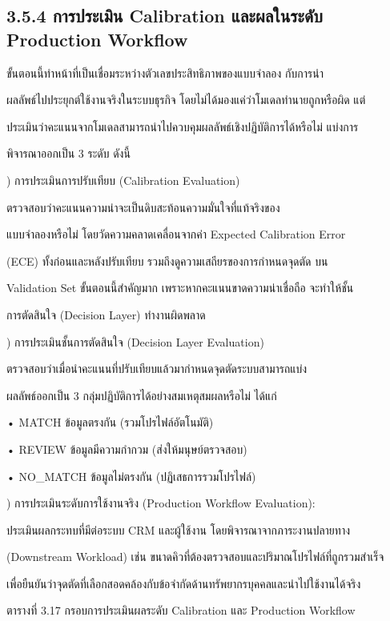 \documentclass[12pt,a4paper]{report}
\begin{document}
\subsection*{3.5.4 การประเมิน Calibration และผลในระดับ Production Workflow}
ขั้นตอนนี้ทำหน้าที่เป็นเชื่อมระหว่างตัวเลขประสิทธิภาพของแบบจำลอง กับการนำ\par
ผลลัพธ์ไปประยุกต์ใช้งานจริงในระบบธุรกิจ โดยไม่ได้มองแค่ว่าโมเดลทำนายถูกหรือผิด แต่\par
ประเมินว่าคะแนนจากโมเดลสามารถนำไปควบคุมผลลัพธ์เชิงปฏิบัติการได้หรือไม่ แบ่งการ\par
พิจารณาออกเป็น 3 ระดับ ดังนี้\par
{}) การประเมินการปรับเทียบ (Calibration Evaluation)\par
ตรวจสอบว่าคะแนนความน่าจะเป็นดิบสะท้อนความมั่นใจที่แท้จริงของ\par
แบบจำลองหรือไม่ โดยวัดความคลาดเคลื่อนจากค่า Expected Calibration Error\par
(ECE) ทั้งก่อนและหลังปรับเทียบ รวมถึงดูความเสถียรของการกำหนดจุดตัด บน\par
\clearpage
Validation Set ขั้นตอนนี้สำคัญมาก เพราะหากคะแนนขาดความน่าเชื่อถือ จะทำให้ชั้น\par
การตัดสินใจ (Decision Layer) ทำงานผิดพลาด\par
{}) การประเมินชั้นการตัดสินใจ (Decision Layer Evaluation)\par
ตรวจสอบว่าเมื่อนำคะแนนที่ปรับเทียบแล้วมากำหนดจุดตัดระบบสามารถแบ่ง\par
ผลลัพธ์ออกเป็น 3 กลุ่มปฏิบัติการได้อย่างสมเหตุสมผลหรือไม่ ได้แก่\par
\noindent • MATCH ข้อมูลตรงกัน (รวมโปรไฟล์อัตโนมัติ)\par
\noindent • REVIEW ข้อมูลมีความกำกวม (ส่งให้มนุษย์ตรวจสอบ)\par
\noindent • NO\_MATCH ข้อมูลไม่ตรงกัน (ปฏิเสธการรวมโปรไฟล์)\par
{}) การประเมินระดับการใช้งานจริง (Production Workflow Evaluation):\par
ประเมินผลกระทบที่มีต่อระบบ CRM และผู้ใช้งาน โดยพิจารณาจากภาระงานปลายทาง\par
(Downstream Workload) เช่น ขนาดคิวที่ต้องตรวจสอบและปริมาณโปรไฟล์ที่ถูกรวมสำเร็จ\par
เพื่อยืนยันว่าจุดตัดที่เลือกสอดคล้องกับข้อจำกัดด้านทรัพยากรบุคคลและนำไปใช้งานได้จริง\par
\begin{center}\small ตารางที่ 3.17 กรอบการประเมินผลระดับ Calibration และ Production Workflow\end{center}
\end{document}
